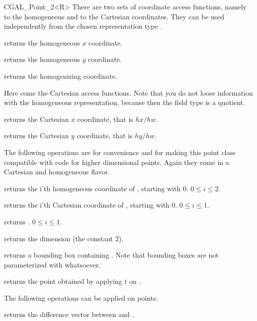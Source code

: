 \begin{ccClassTemplate} {CGAL_Point_2<R>}
There are two sets of coordinate access functions, namely to the
homogeneous and to the Cartesian coordinates. They can be used
independently from the chosen representation type .

       {returns the homogeneous $x$ coordinate.}

       {returns the homogeneous $y$ coordinate.}

       {returns the homogenizing  coordinate.}

Here come the Cartesian access functions. Note that you do not loose
information with the homogeneous representation, because then the field
type is a quotient.

       {returns the Cartesian $x$ coordinate, that is $hx/hw$.}

       {returns the Cartesian $y$ coordinate, that is $hy/hw$.}


The following operations are for convenience and for making this
point class compatible with code for higher dimensional points.
Again they come in a Cartesian and homogeneous flavor.

       {returns the i'th homogeneous coordinate of \ccVar, starting with 0.
        \ccPrecond $0\leq i \leq 2$.}

       {returns the i'th Cartesian coordinate of \ccVar, starting with 0.
        \ccPrecond $0\leq i \leq 1$.}

       {returns .
        \ccPrecond $0\leq i \leq 1$.}

       {returns the dimension (the constant 2).}

       {returns a bounding box containing \ccVar. Note that bounding boxes
        are not parameterized with whatsoever. }

       {returns the point obtained by applying $t$ on \ccVar.}



The following operations can be applied on points:

       {returns the difference vector between  and .}


\end{ccClassTemplate}
